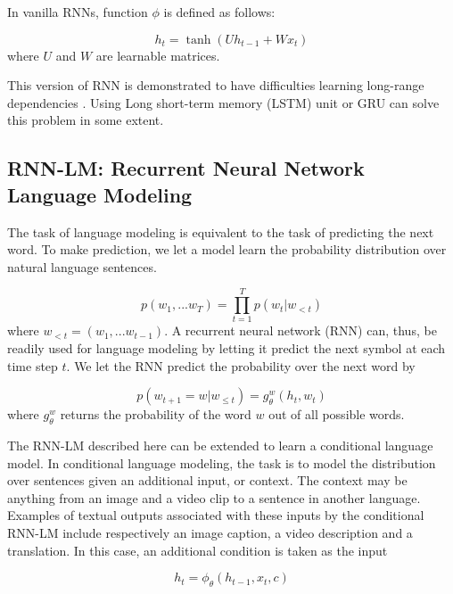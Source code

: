 In vanilla RNNs, function $\phi$ is defined as follows:

\begin{equation}
h_t=\tanh(Uh_{t-1}+Wx_t)
\end{equation}
where $U$ and $W$ are learnable matrices.

This version of RNN is demonstrated to have difficulties learning long-range dependencies \cite{hochreiter1991untersuchungen,pascanu2013difficulty}. Using Long short-term memory (LSTM) unit \cite{hochreiter1997long} or GRU \cite{chung2014empirical,cho2014learning} can solve this problem in some extent.

\subsection{RNN-LM: Recurrent Neural Network Language Modeling}
The task of language modeling is equivalent to the task of predicting the next word. To make prediction, we let a model learn the probability distribution over natural language sentences.

\begin{equation}
p(w_1,...w_T)=\prod_{t=1}^{T}p(w_t|w_{<t})
\end{equation}
where $w_{<t}=(w_1,...w_{t-1})$. A recurrent neural network (RNN) can, thus, be readily used for language modeling by letting it predict the next symbol at each time step $t$. We let the RNN
predict the probability over the next word by

\begin{equation}
p(w_{t+1}=w|w_{\le t})=g_{\theta}^w(h_t,w_t)
\end{equation}
where $g_{\theta}^w$ returns the probability of the word $w$ out of all possible words.

The RNN-LM described here can be extended to learn a conditional language model. In conditional language modeling, the task is to model the distribution over sentences given an additional input, or context. The context may be anything from an image and a video clip to a sentence in another language. Examples of textual outputs associated with these inputs by the conditional RNN-LM include respectively an image caption, a video description and a translation. In this case, an additional condition is taken as the input

\begin{equation}
h_t=\phi_\theta(h_{t-1},x_t,c)
\end{equation}

